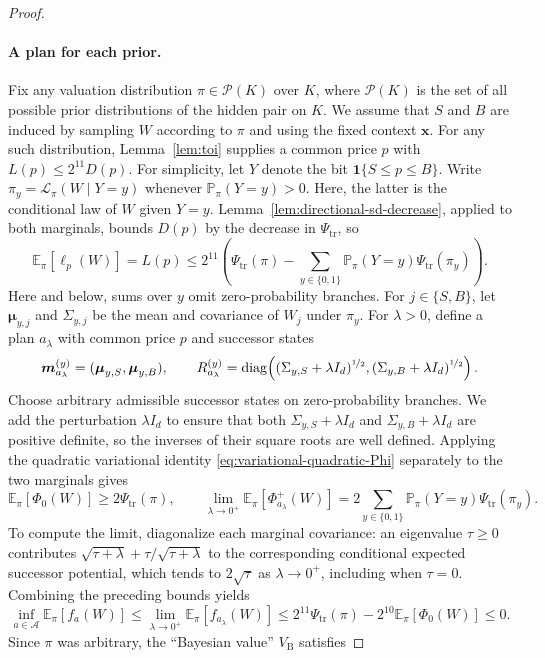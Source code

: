 \documentclass[11pt]{article}
\newcommand{\Esub}[2]{\mathbb E_{#1}\left[#2\right]}
\newcommand{\bmu}{\boldsymbol\mu}
\newcommand{\bm}{\boldsymbol m}
\newcommand{\bx}{\boldsymbol x}
\begin{document}
\begin{proof}
\paragraph{A plan for each prior.}
Fix any valuation distribution $\pi\in\mathcal P(K)$ over $K$, where $\mathcal P(K)$ is the set of all possible prior distributions of the hidden pair on $K$. We assume that $S$ and $B$ are induced by sampling $W$ according to $\pi$ and {using }the fixed context $\bx$. For any such distribution, Lemma~\ref{lem:toi} supplies a common price $p$ with $L(p)\le2^{11} D(p)$. {For simplicity, let $Y$ denote the bit $\mathbf1\{S\le p\le B\}$. Write $\pi_y=\mathcal L_\pi(W\mid Y=y)$ whenever $\mathbb P_\pi(Y=y)>0$.} {Here, the latter is the conditional law of $W$ given $Y=y$.} Lemma~\ref{lem:directional-sd-decrease}, applied to both marginals, bounds $D(p)$ by the {decrease in} $\Psi_{\mathrm{tr}}$, so
\[
 \Esub{\pi}{\ell_p(W)}=L(p)
 \le2^{11}\left(\Psi_{\mathrm{tr}}(\pi)
                   -\sum_{y \in \{0,1\}}\mathbb P_\pi(Y=y)\Psi_{\mathrm{tr}}(\pi_y)\right).
\]
Here and below, sums over $y$ omit zero-probability branches. For $j\in\{S,B\}$, let $\bmu_{y,j}$ and $\Sigma_{y,j}$ be the mean and covariance of $W_j$ under $\pi_y$. For $\lambda>0$, define a plan $a_\lambda$ with common price $p$ and successor states
\[
 \bm_{a_\lambda}^{(y)}=(\bmu_{y,S},\bmu_{y,B}),\qquad
 R_{a_\lambda}^{(y)}=\operatorname{diag}\!\left(
 (\Sigma_{y,S}+\lambda I_d)^{\nicefrac 12},
 (\Sigma_{y,B}+\lambda I_d)^{\nicefrac 12}\right).
\]
Choose arbitrary admissible successor states on zero-probability branches.
{We add} the perturbation $\lambda I_d$ to ensure that both $\Sigma_{y,S}+\lambda I_d$ and $\Sigma_{y,B}+\lambda I_d$ are positive definite{, so the inverses of their square roots are well defined.}  Applying the quadratic variational identity \eqref{eq:variational-quadratic-Phi} separately to the two marginals gives
\[
 \Esub{\pi}{\Phi_0(W)}\ge2\Psi_{\mathrm{tr}}(\pi),\qquad
 \lim_{\lambda\to0^+}\Esub{\pi}{\Phi_{a_\lambda}^+(W)}
 =2\sum_{y \in \{0,1\}}\mathbb P_\pi(Y=y)\Psi_{\mathrm{tr}}(\pi_y).
\]
{To compute the limit, diagonalize each marginal covariance: an eigenvalue $\tau\ge0$ contributes $\sqrt{\tau+\lambda}+\tau/\sqrt{\tau+\lambda}$ to the corresponding conditional expected successor potential, which tends to $2\sqrt\tau$ as $\lambda\to 0^+$, including when $\tau=0$.} Combining the preceding bounds yields
\[
 \inf_{a\in\mathcal A}\Esub{\pi}{f_a(W)}
 \le\lim_{\lambda\to0^+}\Esub{\pi}{f_{a_\lambda}(W)}
 \le2^{11}\Psi_{\mathrm{tr}}(\pi)-2^{10}\Esub{\pi}{\Phi_0(W)}\le0.
\]
Since $\pi$ was arbitrary, the ``Bayesian value'' $V_{\mathrm B}$ satisfies

\end{proof}
\end{document}
